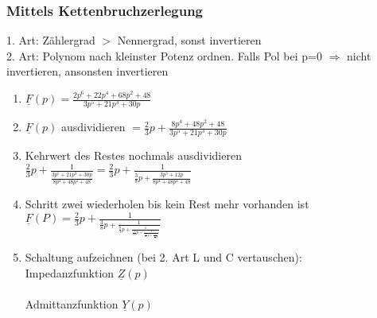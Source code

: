 \begin{multicols}{2}
\subsubsection{Mittels Kettenbruchzerlegung}
1. Art: Zählergrad $>$ Nennergrad, sonst invertieren\\
2. Art: Polynom nach kleinster Potenz ordnen. Falls Pol bei p=0 $\Rightarrow$ nicht
invertieren, ansonsten invertieren
\begin{enumerate}
	\item $\underline{F}(p)=\frac{2p^6+22p^4+68p^2+48}{3p^5+21p^3+30p}$
	\item $\underline{F}(p)$ ausdividieren $=\frac{2}{3}p+\frac{8p^4+48p^2+48}{3p^5+21p^3+30p}$
	\item Kehrwert des Restes nochmals ausdividieren
	$\frac{2}{3}p+\frac{1}{\frac{3p^5+21p^3+30p}{8p^4+48p^2+48}}=\frac{2}{3}p+\frac{1}{\frac{3}{8}p+\frac{3p^3+12p}{8p^4+48p^2+48}}$
	\item Schritt zwei wiederholen bis kein Rest mehr vorhanden ist
	$\underline{F}(P)=\frac{2}{3}p+\frac{1}{\frac{3}{8}p+\frac{1}{\frac{8}{3}p+\frac{1}{\frac{3}{16}p+\frac{1}{\frac{16}{3}p+\frac{1}{\frac{1}{16}p}}}}}$
	\item Schaltung aufzeichnen  (bei 2. Art L und C vertauschen):\\
		Impedanzfunktion $\underline{Z}(p)$\\
		\hspace*{0.5cm}\scalebox{0.6}{}\\
		Admittanzfunktion $\underline{Y}(p)$\\
		\hspace*{0.5cm}\scalebox{0.6}{}\\
\end{enumerate}

\end{multicols}


